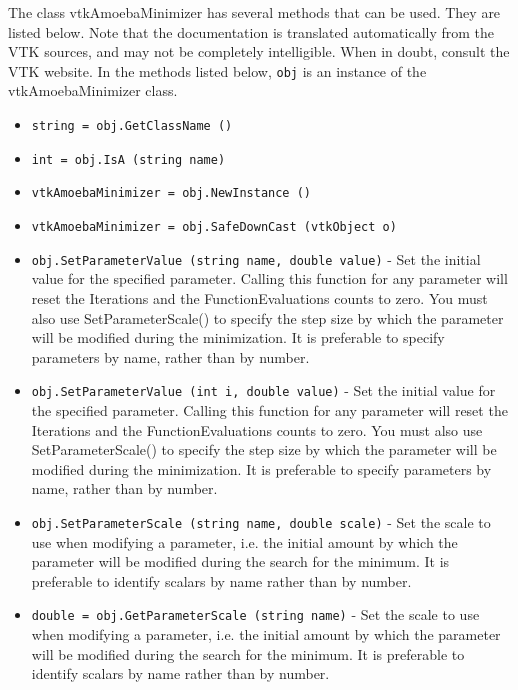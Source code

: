 The class vtkAmoebaMinimizer has several methods that can be used.
  They are listed below.
Note that the documentation is translated automatically from the VTK sources,
and may not be completely intelligible.  When in doubt, consult the VTK website.
In the methods listed below, \verb|obj| is an instance of the vtkAmoebaMinimizer class.
\begin{itemize}
\item  \verb|string = obj.GetClassName ()|

\item  \verb|int = obj.IsA (string name)|

\item  \verb|vtkAmoebaMinimizer = obj.NewInstance ()|

\item  \verb|vtkAmoebaMinimizer = obj.SafeDownCast (vtkObject o)|

\item  \verb|obj.SetParameterValue (string name, double value)| -  Set the initial value for the specified parameter.  Calling
 this function for any parameter will reset the Iterations
 and the FunctionEvaluations counts to zero.  You must also
 use SetParameterScale() to specify the step size by which the
 parameter will be modified during the minimization.  It is
 preferable to specify parameters by name, rather than by
 number.

\item  \verb|obj.SetParameterValue (int i, double value)| -  Set the initial value for the specified parameter.  Calling
 this function for any parameter will reset the Iterations
 and the FunctionEvaluations counts to zero.  You must also
 use SetParameterScale() to specify the step size by which the
 parameter will be modified during the minimization.  It is
 preferable to specify parameters by name, rather than by
 number.

\item  \verb|obj.SetParameterScale (string name, double scale)| -  Set the scale to use when modifying a parameter, i.e. the
 initial amount by which the parameter will be modified
 during the search for the minimum.  It is preferable to
 identify scalars by name rather than by number.

\item  \verb|double = obj.GetParameterScale (string name)| -  Set the scale to use when modifying a parameter, i.e. the
 initial amount by which the parameter will be modified
 during the search for the minimum.  It is preferable to
 identify scalars by name rather than by number.


\end{itemize}
